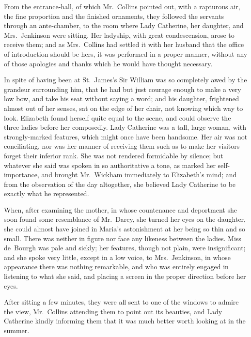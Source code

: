 From the entrance-hall, of which Mr.\ Collins pointed out, with a
rapturous air, the fine proportion and the finished ornaments,
they followed the servants through an ante-chamber, to the room
where Lady Catherine, her daughter, and Mrs.\ Jenkinson were
sitting.  Her ladyship, with great condescension, arose to receive
them; and as Mrs.\ Collins had settled it with her husband that the
office of introduction should be hers, it was performed in a
proper manner, without any of those apologies and thanks which
he would have thought necessary.

In spite of having been at St.\ James's Sir William was so
completely awed by the grandeur surrounding him, that he had
but just courage enough to make a very low bow, and take his
seat without saying a word; and his daughter, frightened almost
out of her senses, sat on the edge of her chair, not knowing
which way to look.  Elizabeth found herself quite equal to the
scene, and could observe the three ladies before her composedly.
Lady Catherine was a tall, large woman, with strongly-marked
features, which might once have been handsome.  Her air was
not conciliating, nor was her manner of receiving them such as
to make her visitors forget their inferior rank.  She was not
rendered formidable by silence; but whatever she said was
spoken in so authoritative a tone, as marked her self-importance,
and brought Mr.\ Wickham immediately to Elizabeth's mind; and
from the observation of the day altogether, she believed Lady
Catherine to be exactly what he represented.

When, after examining the mother, in whose countenance and
deportment she soon found some resemblance of Mr.\ Darcy, she
turned her eyes on the daughter, she could almost have joined
in Maria's astonishment at her being so thin and so small.  There
was neither in figure nor face any likeness between the ladies.
Miss de~Bourgh was pale and sickly; her features, though not
plain, were insignificant; and she spoke very little, except in
a low voice, to Mrs.\ Jenkinson, in whose appearance there was
nothing remarkable, and who was entirely engaged in listening to
what she said, and placing a screen in the proper direction before
her eyes.

After sitting a few minutes, they were all sent to one of the
windows to admire the view, Mr.\ Collins attending them to
point out its beauties, and Lady Catherine kindly informing
them that it was much better worth looking at in the summer.

